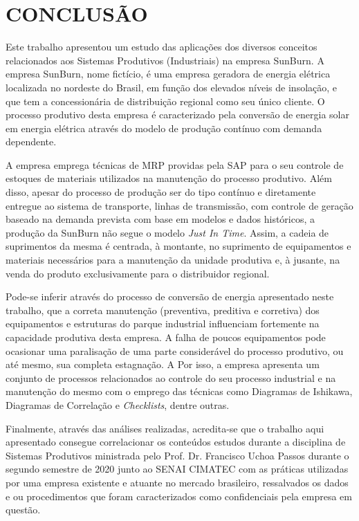 \chapter{CONCLUSÃO}
\label{chap:conclusao}

Este trabalho apresentou um estudo das aplicações dos diversos conceitos relacionados aos Sistemas Produtivos (Industriais) na empresa SunBurn. A empresa SunBurn, nome fictício, é uma empresa geradora de energia elétrica localizada no nordeste do Brasil, em função dos elevados níveis de insolação, e que tem a concessionária de distribuição regional como seu único cliente. O processo produtivo desta empresa é caracterizado pela conversão de energia solar em energia elétrica através do modelo de produção contínuo com demanda dependente.

A empresa emprega técnicas de \ac{MRP} providas pela \ac{SAP} para o seu controle de estoques de materiais utilizados na manutenção do processo produtivo. Além disso, apesar do processo de produção ser do tipo contínuo e diretamente entregue ao sistema de transporte, linhas de transmissão, com controle de geração baseado na demanda prevista com base em modelos e dados históricos, a produção da SunBurn não segue o modelo \textit{Just In Time}. Assim, a cadeia de suprimentos da mesma é centrada, à montante, no suprimento de equipamentos e materiais necessários para a manutenção da unidade produtiva e, à jusante, na venda do produto exclusivamente para o distribuidor regional.

Pode-se inferir através do processo de conversão de energia apresentado neste trabalho, que a correta manutenção (preventiva, preditiva e corretiva) dos equipamentos e estruturas do parque industrial influenciam fortemente na capacidade produtiva desta empresa. A falha de poucos equipamentos pode ocasionar uma paralisação de uma parte considerável do processo produtivo, ou até mesmo, sua completa estagnação. A Por isso, a empresa apresenta um conjunto de processos relacionados ao controle do seu processo industrial e na manutenção do mesmo com o emprego das técnicas como Diagramas de Ishikawa, Diagramas de Correlação e \textit{Checklists}, dentre outras.

Finalmente, através das análises realizadas, acredita-se que o trabalho aqui apresentado consegue correlacionar os conteúdos estudos durante a disciplina de Sistemas Produtivos ministrada pelo Prof. Dr. Francisco Uchoa Passos durante o segundo semestre de 2020 junto ao SENAI CIMATEC com as práticas utilizadas por uma empresa existente e atuante no mercado brasileiro, ressalvados os dados e ou procedimentos que foram caracterizados como confidenciais pela empresa em questão.